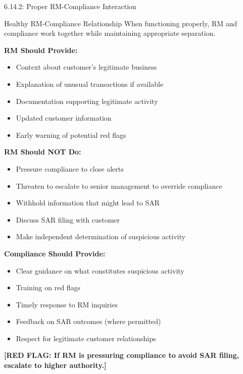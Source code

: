 \documentclass[11pt,a4paper]{beamer}
\newcommand{\redflag}[1]{\textcolor{red!80!black}{\textbf{[RED FLAG: #1]}}}
\begin{document}
\begin{frame}{6.14.2: Proper RM-Compliance Interaction}
	\begin{block}{Healthy RM-Compliance Relationship}
		When functioning properly, RM and compliance work together while maintaining appropriate separation.
	\end{block}
	\textbf{RM Should Provide:}
	\begin{itemize}
		\item Context about customer's legitimate business
		\item Explanation of unusual transactions if available
		\item Documentation supporting legitimate activity
		\item Updated customer information
		\item Early warning of potential red flags
	\end{itemize}
	\textbf{RM Should NOT Do:}
	\begin{itemize}
		\item Pressure compliance to close alerts
		\item Threaten to escalate to senior management to override compliance
		\item Withhold information that might lead to SAR
		\item Discuss SAR filing with customer
		\item Make independent determination of suspicious activity
	\end{itemize}
	\textbf{Compliance Should Provide:}
	\begin{itemize}
		\item Clear guidance on what constitutes suspicious activity
		\item Training on red flags
		\item Timely response to RM inquiries
		\item Feedback on SAR outcomes (where permitted)
		\item Respect for legitimate customer relationships
	\end{itemize}
	\redflag{If RM is pressuring compliance to avoid SAR filing, escalate to higher authority.}
\end{frame}

\end{document}
